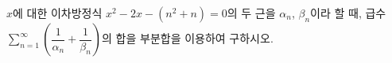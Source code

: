 $x$에 대한 이차방정식 $x^2-2x-(n^2+n)=0$의 두 근을 $\alpha_n$, $\beta_n$이라 할 때, 급수 $\displaystyle\sum_{n=1}^{\infty}\left(\dfrac{1}{\alpha_n}+\dfrac{1}{\beta_n}\right)$의 합을 부분합을 이용하여 구하시오.

